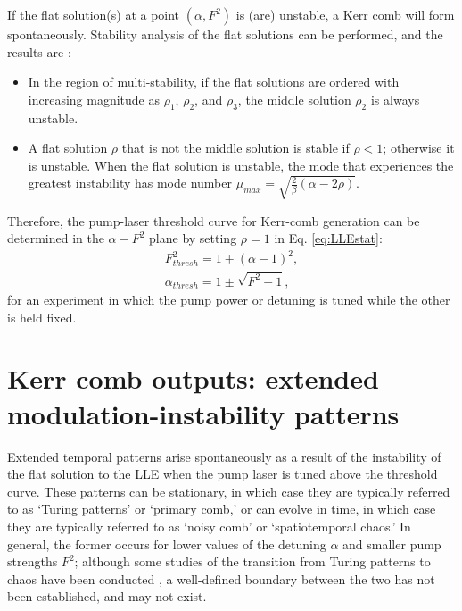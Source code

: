 {If the flat solution(s) at a point $(\alpha,F^2)$ is (are) unstable, a Kerr comb will form spontaneously. Stability analysis of the flat solutions can be performed, and the results are \cite{Godey2014}:
\begin{itemize}
	\item In the region of multi-stability, if the flat solutions are ordered with increasing magnitude as $\rho_1$, $\rho_2$, and $\rho_3$, the middle solution $\rho_2$ is always unstable. 
	\item A flat solution $\rho$ that is not the middle solution is stable if $\rho<1$; otherwise it is unstable. When the flat solution is unstable, the mode that experiences the greatest instability has mode number $\mu_{max}=\sqrt{\frac{2}{\beta}(\alpha-2\rho)}$.  
\end{itemize}

Therefore, the pump-laser threshold curve for Kerr-comb generation can be determined in the $\alpha-F^2$ plane by setting $\rho=1$ in Eq. \ref{eq:LLEstat}: 
\begin{align}
F^2_{thresh}=1+(\alpha-1)^2, \\
\alpha_{thresh}=1\pm\sqrt{F^2-1},
\end{align} 
for an experiment in which the pump power or detuning is tuned while the other is held fixed. 



\section{Kerr comb outputs: extended modulation-instability patterns}

Extended temporal patterns arise spontaneously as a result of the instability of the flat solution to the LLE when the pump laser is tuned above the threshold curve. These patterns can be stationary, in which case they are typically referred to as `Turing patterns' or `primary comb,' or can evolve in time, in which case they are typically referred to as `noisy comb' or `spatiotemporal chaos.' In general, the former occurs for lower values of the detuning $\alpha$ and smaller pump strengths $F^2$; although some studies of the transition from Turing patterns to chaos have been conducted \cite{Coillet2014,others}, a well-defined boundary between the two has not been established, and may not exist. 

}
